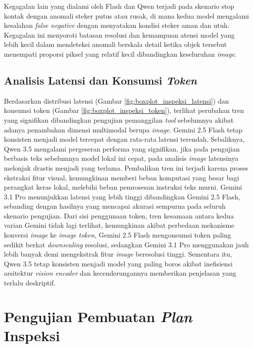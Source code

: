 Kegagalan lain yang dialami oleh Flash dan Qwen terjadi pada skenario stop kontak dengan anomali steker putus atau rusak, di mana kedua model mengalami kesalahan \textit{false negative} dengan menyatakan kondisi steker aman dan utuh. Kegagalan ini menyoroti batasan resolusi dan kemampuan atensi model yang lebih kecil dalam mendeteksi anomali berskala detail ketika objek tersebut menempati proporsi piksel yang relatif kecil dibandingkan keseluruhan \textit{image}.

\subsection{Analisis Latensi dan Konsumsi \textit{Token}}
Berdasarkan distribusi latensi (Gambar \ref{fig:boxplot_inspeksi_latensi}) dan konsumsi token (Gambar \ref{fig:boxplot_inspeksi_token}), terlihat perubahan tren yang signifikan dibandingkan pengujian pemanggilan \textit{tool} sebelumnya akibat adanya penambahan dimensi multimodal berupa \textit{image}. Gemini 2.5 Flash tetap konsisten menjadi model tercepat dengan rata-rata latensi terendah. Sebaliknya, Qwen 3.5 mengalami pergeseran performa yang signifikan, jika pada pengujian berbasis teks sebelumnya model lokal ini cepat, pada analisis \textit{image} latensinya melonjak drastis menjadi yang terlama. Pembalikan tren ini terjadi karena proses ekstraksi fitur visual, kemungkinan memberi beban komputasi yang besar bagi perangkat keras lokal, melebihi beban pemrosesan instruksi teks murni. Gemini 3.1 Pro menunjukkan latensi yang lebih tinggi dibandingkan Gemini 2.5 Flash, sebanding dengan hasilnya yang mencapai akurasi sempurna pada seluruh skenario pengujian. Dari sisi penggunaan token, tren kesamaan antara kedua varian Gemini tidak lagi terlihat, kemungkinan akibat perbedaan mekanisme konversi \textit{image} ke \textit{image token}, Gemini 2.5 Flash mengonsumsi token paling sedikit berkat \textit{downscaling} resolusi, sedangkan Gemini 3.1 Pro menggunakan jauh lebih banyak demi mengekstrak fitur \textit{image} beresolusi tinggi. Sementara itu, Qwen 3.5 tetap konsisten menjadi model yang paling boros akibat inefisiensi arsitektur \textit{vision encoder} dan kecenderungannya memberikan penjelasan yang terlalu deskriptif.



\section{Pengujian Pembuatan \textit{Plan} Inspeksi}
\label{sec:pengujian_plan}

